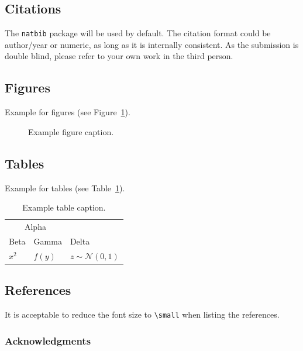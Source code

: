 \documentclass{article}
\begin{document}
\subsection{Citations} 

The \verb+natbib+ package will be used by default. The citation format could be 
author/year or numeric, as long as it is internally consistent. As the 
submission is double blind, please refer to your own work in the third person.

\subsection{Figures}

Example for figures (see Figure~\ref{fig:example}).

\begin{figure}[h]
  \centering
  \fbox{\rule[-.5cm]{0cm}{2cm} \rule[-.5cm]{5cm}{0cm}}
  \caption{Example figure caption.}
  \label{fig:example}
\end{figure}

\subsection{Tables}

Example for tables (see Table~\ref{table:example}).

\begin{table}[h]
  \caption{Example table caption.}
  \label{table:example}
  \centering
  \begin{tabular}{lll}
    \toprule
    \multicolumn{2}{c}{Alpha}                   \\
    \cmidrule(r){1-2}
    Beta     & Gamma     & Delta \\
    \midrule
    $x^2$     & $f(y)$ & $z \sim \mathcal{N}(0, 1)$      \\
    \bottomrule
  \end{tabular}
\end{table}

\subsection{References}

It is acceptable to reduce the font size to \verb+\small+ when listing the 
references.

\subsubsection*{Acknowledgments}
\end{document}
